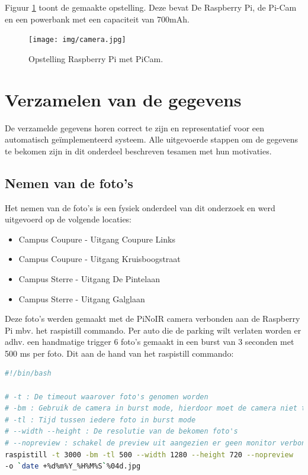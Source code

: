 Figuur \ref{Opstelling} toont de gemaakte opstelling. Deze bevat De Raspberry Pi, de Pi-Cam en een powerbank met een capaciteit van 700mAh.
\begin{figure}[h]
	\centering
	\texttt{[image: img/camera.jpg]}
	\caption{Opstelling Raspberry Pi met PiCam.}
	\label{Opstelling}
\end{figure}

\section{Verzamelen van de gegevens}
De verzamelde gegevens horen correct te zijn en representatief voor een automatisch geïmplementeerd systeem. Alle uitgevoerde stappen om de gegevens te bekomen zijn in dit onderdeel beschreven tesamen met hun motivaties.

\subsection{Nemen van de foto's}
Het nemen van de foto's is een fysiek onderdeel van dit onderzoek en werd uitgevoerd op de volgende locaties:
\begin{itemize}
	\item Campus Coupure - Uitgang Coupure Links
	\item Campus Coupure - Uitgang Kruisboogstraat
	\item Campus Sterre - Uitgang De Pintelaan
	\item Campus Sterre - Uitgang Galglaan
\end{itemize}

Deze foto's werden gemaakt met de PiNoIR camera verbonden aan de Raspberry Pi mbv. het raspistill commando. Per auto die de parking wilt verlaten worden er adhv. een handmatige trigger 6 foto's gemaakt in een burst van 3 seconden met 500 ms per foto. Dit aan de hand van het raspistill commando:  
\begin{lstlisting}[language=Bash, breaklines=true]
#!/bin/bash

# -t : De timeout waarover foto's genomen worden
# -bm : Gebruik de camera in burst mode, hierdoor moet de camera niet telkens opnieuw focussen tussen iedere genomen foto
# -tl : Tijd tussen iedere foto in burst mode
# --width --height : De resolutie van de bekomen foto's
# --nopreview : schakel de preview uit aangezien er geen monitor verbonden is
raspistill -t 3000 -bm -tl 500 --width 1280 --height 720 --nopreview
-o `date +%d%m%Y_%H%M%S`%04d.jpg
\end{lstlisting}

